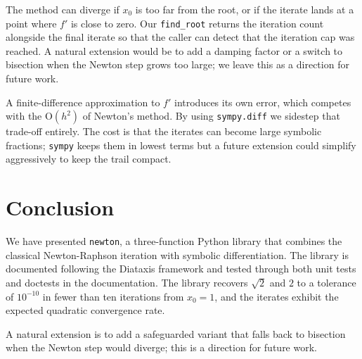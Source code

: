 \documentclass[11pt]{article}
\begin{document}
The method can diverge if \(x_0\) is too far from
the root, or if the iterate lands at a point where \(f'\) is close to
zero. Our \texttt{find\_root} returns the iteration count alongside the
final iterate so that the caller can detect that the iteration cap was
reached. A natural extension would be to add a damping factor or a switch
to bisection when the Newton step grows too large; we leave this as a
direction for future work.

A finite-difference approximation
to \(f'\) introduces its own error, which competes with the
\(\text{O}(h^2)\) of Newton's method. By using \texttt{sympy.diff} we
sidestep that trade-off entirely. The cost is that the iterates can
become large symbolic fractions; \texttt{sympy} keeps them in lowest
terms but a future extension could simplify aggressively to keep the
trail compact.

\section{Conclusion}

We have presented \texttt{newton}, a three-function Python library that
combines the classical Newton-Raphson iteration with symbolic
differentiation. The library is documented following the Diataxis
framework and tested through both unit tests and doctests in the
documentation. The library recovers \(\sqrt{2}\) and \(2\) to a
tolerance of \(10^{-10}\) in fewer than ten iterations from
\(x_0 = 1\), and the iterates exhibit the expected quadratic convergence
rate.

A natural extension is to add a safeguarded variant that falls back to
bisection when the Newton step would diverge; this is a direction for
future work.



\end{document}
